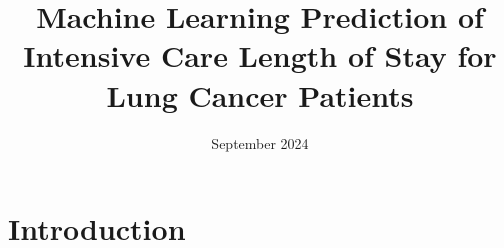 \documentclass[11pt]{article}
\begin{document}
\title{Machine Learning Prediction of Intensive Care Length of Stay for Lung Cancer Patients}
\date{September 2024}
\maketitle
\newpage
\tableofcontents
\pagebreak

\begin{abstract}
    
\end{abstract}

\renewcommand{\abstractname}{Acknowledgements}
\begin{abstract}
 
\end{abstract}
\newpage

\section{Introduction}

\end{document}
